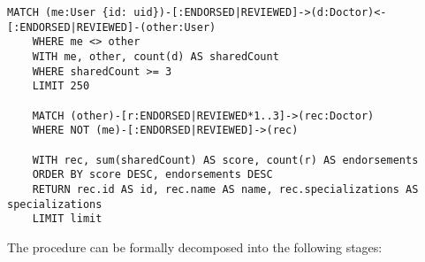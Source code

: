 \begin{lstlisting}[language=cypher, caption={Equivalent Cypher query for Recommendations with Collaborative Filtering}]
	MATCH (me:User {id: uid})-[:ENDORSED|REVIEWED]->(d:Doctor)<-[:ENDORSED|REVIEWED]-(other:User)
	WHERE me <> other
	WITH me, other, count(d) AS sharedCount
	WHERE sharedCount >= 3
	LIMIT 250
	
	MATCH (other)-[r:ENDORSED|REVIEWED*1..3]->(rec:Doctor)
	WHERE NOT (me)-[:ENDORSED|REVIEWED]->(rec)
	
	WITH rec, sum(sharedCount) AS score, count(r) AS endorsements
	ORDER BY score DESC, endorsements DESC
	RETURN rec.id AS id, rec.name AS name, rec.specializations AS specializations
	LIMIT limit
\end{lstlisting}

The procedure can be formally decomposed into the following stages:

